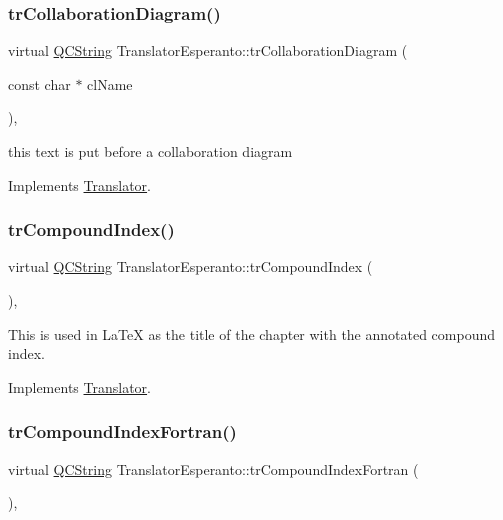 \subsubsection{\texorpdfstring{trCollaborationDiagram()}{trCollaborationDiagram()}}
{\footnotesize\ttfamily virtual \mbox{\hyperlink{class_q_c_string}{Q\+C\+String}} Translator\+Esperanto\+::tr\+Collaboration\+Diagram (\begin{DoxyParamCaption}\item[{const char $\ast$}]{cl\+Name }\end{DoxyParamCaption})\hspace{0.3cm}{\ttfamily [inline]}, {\ttfamily [virtual]}}

this text is put before a collaboration diagram 

Implements \mbox{\hyperlink{class_translator}{Translator}}.

\mbox{\label{class_translator_esperanto_a1a30d922db5853fc24ddbee5e25643d6}} 
\subsubsection{\texorpdfstring{trCompoundIndex()}{trCompoundIndex()}}
{\footnotesize\ttfamily virtual \mbox{\hyperlink{class_q_c_string}{Q\+C\+String}} Translator\+Esperanto\+::tr\+Compound\+Index (\begin{DoxyParamCaption}{ }\end{DoxyParamCaption})\hspace{0.3cm}{\ttfamily [inline]}, {\ttfamily [virtual]}}

This is used in La\+TeX as the title of the chapter with the annotated compound index. 

Implements \mbox{\hyperlink{class_translator}{Translator}}.

\mbox{\label{class_translator_esperanto_a788be4348065c9fb576fea95b43f11df}} 
\subsubsection{\texorpdfstring{trCompoundIndexFortran()}{trCompoundIndexFortran()}}
{\footnotesize\ttfamily virtual \mbox{\hyperlink{class_q_c_string}{Q\+C\+String}} Translator\+Esperanto\+::tr\+Compound\+Index\+Fortran (\begin{DoxyParamCaption}{ }\end{DoxyParamCaption})\hspace{0.3cm}{\ttfamily [inline]}, {\ttfamily [virtual]}}

